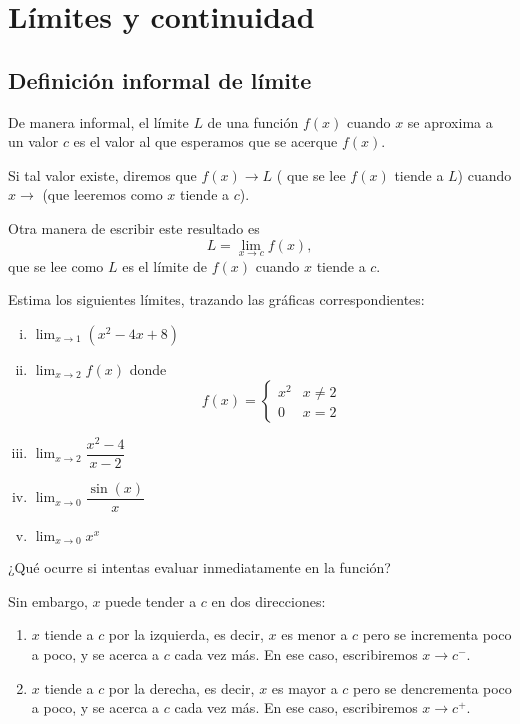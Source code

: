 \section{Límites y continuidad}

\subsection{Definición informal de límite}

De manera informal, el límite $ L $ de una función $ f(x) $ cuando $ x $ se aproxima a un valor $ c $ es el valor al que esperamos que se acerque $ f(x) $.

Si tal valor existe, diremos que $ f(x)\to L $ ( que se lee  $f(x)  $ tiende a $ L $) cuando $ x \to  $ (que leeremos como $ x $ tiende a $ c $).

Otra manera de escribir este resultado es
\[ L = \lim_{x\to c} f(x) ,\]
que se lee como $ L $ es el límite de $ f(x) $ cuando $ x $ tiende a $ c $.


\begin{resuelto}
	Estima los siguientes límites, trazando las gráficas correspondientes:
	\begin{enumerate}[(i)]
		\item $\lim_{x\to 1}\left( x^{2}-4x+8 \right)$
		\item $ \lim_{x\to 2} f(x) $ donde
		$$f(x)= \begin{cases}
			x^{2} & x\neq 2 \\
			0 & x =2
		\end{cases}$$
		\item $\lim_{x\to 2}\dfrac{x^{2}-4}{x-2}$
		\item $\lim_{x\to 0}\dfrac{\sin(x)}{x}$
		\item $ \lim_{x \to 0} x^{x} $
	\end{enumerate}
	¿Qué ocurre si intentas evaluar inmediatamente en la función?
\end{resuelto}

Sin embargo, $ x $ puede tender a $ c $ en dos direcciones:
\begin{enumerate}
	\item $ x $ tiende a $ c $ por la izquierda, es decir, $ x $ es menor a $ c $ pero se incrementa poco a poco, y se acerca a $ c $ cada vez más. En ese caso, escribiremos $ x\to c^{-} .$
	\item $ x $ tiende a $ c $ por la derecha, es decir, $ x $ es mayor a $ c $ pero se dencrementa poco a poco, y se acerca a $ c $ cada vez más. En ese caso, escribiremos $ x\to c^{+} .$
\end{enumerate}

